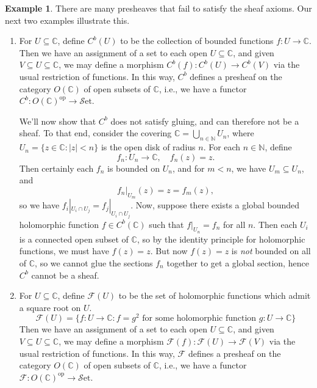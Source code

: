 \documentclass[10pt,oneside]{book}
\def\~#1{\mathscr{#1}}
\newcommand{\C}{\mathbb{C}}
\newcommand{\N}{\mathbb{N}}
\newcommand{\op}{\mathrm{op}}
\newcommand{\Set}{\~S\mathrm{et}}
\theoremstyle{plain}
\theoremstyle{definition}
\newtheorem{ex}[thm]{Example}
\theoremstyle{remark}
\numberwithin{equation}{section}
\numberwithin{figure}{section}
\begin{document}
\begin{ex} There are many presheaves that fail to satisfy the sheaf axioms. Our next two examples illustrate this.
    \begin{enumerate}[label=(\roman*)]
        \item For $U \subseteq \C$, define $C^b(U)$ to be the collection of bounded functions $f : U \to \C$. Then we have an assignment of a set to each open $U \subseteq \C$, and given $V \subseteq U \subseteq \C$, we may define a morphism $C^b(f): C^b(U) \to C^b(V)$ via the usual restriction of functions. In this way, $C^b$ defines a presheaf on the category $O(\C)$ of open subsets of $\C$, i.e., we have a functor $C^b: O(\C)^\op \to \Set$.

        We'll now show that $C^b$ does not satisfy gluing, and can therefore not be a sheaf. To that end, consider the covering $\C = \bigcup_{n \in \N} U_n$, where $U_n = \{z \in \C : |z| < n\}$ is the open disk of radius $n$. For each $n \in \N$, define
            \[f_n: U_n \to \C, \quad f_n(z) = z.\]
        Then certainly each $f_n$ is bounded on $U_n$, and for $m < n$, we have $U_m \subseteq U_n$, and 
            \[f_n|_{U_m}(z) = z = f_m(z),\]
        so we have $f_i|_{U_i \cap U_j} = f_j|_{U_i \cap U_j}$. Now, suppose there exists a global bounded holomorphic function $f \in C^b(\C)$ such that $f|_{U_n} = f_n$ for all $n$. Then each $U_i$ is a connected open subset of $\C$, so by the identity principle for holomorphic functions, we must have $f(z) = z$. But now $f(z) = z$ is \emph{not} bounded on all of $\C$, so we cannot glue the sections $f_n$ together to get a global section, hence $C^b$ cannot be a sheaf. 

        \item For $U \subseteq \C$, define $\~F(U)$ to be the set of holomorphic functions which admit a square root on $U$.
        \[\~F(U) = \{f: U \to \C :f = g^2 \text{ for some holomorphic function } g: U \to \C\}\] 
        Then we have an assignment of a set to each open $U \subseteq \C$, and given $V \subseteq U \subseteq \C$, we may define a morphism $\~F(f): \~F(U) \to \~F(V)$ via the usual restriction of functions. In this way, $\~F$ defines a presheaf on the category $O(\C)$ of open subsets of $\C$, i.e., we have a functor $\~F: O(\C)^\op \to \Set$.


\end{enumerate}
\end{ex}
\end{document}
